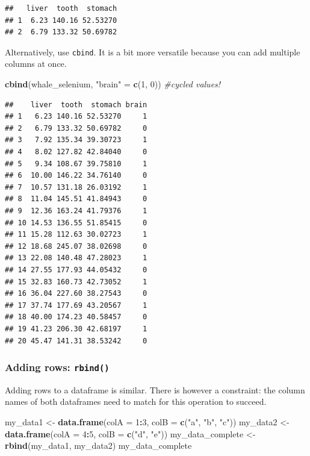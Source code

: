 \documentclass[]{book}
\newenvironment{Shaded}{\begin{snugshade}}{\end{snugshade}}
\newcommand{\CommentTok}[1]{\textcolor[rgb]{0.56,0.35,0.01}{\textit{#1}}}
\newcommand{\DataTypeTok}[1]{\textcolor[rgb]{0.13,0.29,0.53}{#1}}
\newcommand{\DecValTok}[1]{\textcolor[rgb]{0.00,0.00,0.81}{#1}}
\newcommand{\KeywordTok}[1]{\textcolor[rgb]{0.13,0.29,0.53}{\textbf{#1}}}
\newcommand{\NormalTok}[1]{#1}
\newcommand{\OperatorTok}[1]{\textcolor[rgb]{0.81,0.36,0.00}{\textbf{#1}}}
\newcommand{\StringTok}[1]{\textcolor[rgb]{0.31,0.60,0.02}{#1}}
\begin{document}
\begin{verbatim}
##   liver  tooth  stomach
## 1  6.23 140.16 52.53270
## 2  6.79 133.32 50.69782
\end{verbatim}

Alternatively, use \texttt{cbind}. It is a bit more versatile because you can add multiple columns at once.

\begin{Shaded}
\begin{Highlighting}[]
\KeywordTok{cbind}\NormalTok{(whale_selenium, }\StringTok{"brain"}\NormalTok{ =}\StringTok{ }\KeywordTok{c}\NormalTok{(}\DecValTok{1}\NormalTok{, }\DecValTok{0}\NormalTok{)) }\CommentTok{#cycled values!}
\end{Highlighting}
\end{Shaded}

\begin{verbatim}
##    liver  tooth  stomach brain
## 1   6.23 140.16 52.53270     1
## 2   6.79 133.32 50.69782     0
## 3   7.92 135.34 39.30723     1
## 4   8.02 127.82 42.84040     0
## 5   9.34 108.67 39.75810     1
## 6  10.00 146.22 34.76140     0
## 7  10.57 131.18 26.03192     1
## 8  11.04 145.51 41.84943     0
## 9  12.36 163.24 41.79376     1
## 10 14.53 136.55 51.85415     0
## 11 15.28 112.63 30.02723     1
## 12 18.68 245.07 38.02698     0
## 13 22.08 140.48 47.28023     1
## 14 27.55 177.93 44.05432     0
## 15 32.83 160.73 42.73052     1
## 16 36.04 227.60 38.27543     0
## 17 37.74 177.69 43.20567     1
## 18 40.00 174.23 40.58457     0
## 19 41.23 206.30 42.68197     1
## 20 45.47 141.31 38.53242     0
\end{verbatim}

\hypertarget{adding-rows-rbind}{%
\subsubsection*{\texorpdfstring{Adding rows: \texttt{rbind()}}{Adding rows: rbind()}}\label{adding-rows-rbind}}

Adding rows to a dataframe is similar. There is however a constraint: the column names of both dataframes need to match for this operation to succeed.

\begin{Shaded}
\begin{Highlighting}[]
\NormalTok{my_data1 <-}\StringTok{ }\KeywordTok{data.frame}\NormalTok{(}\DataTypeTok{colA =} \DecValTok{1}\OperatorTok{:}\DecValTok{3}\NormalTok{, }\DataTypeTok{colB =} \KeywordTok{c}\NormalTok{(}\StringTok{"a"}\NormalTok{, }\StringTok{"b"}\NormalTok{, }\StringTok{"c"}\NormalTok{))}
\NormalTok{my_data2 <-}\StringTok{ }\KeywordTok{data.frame}\NormalTok{(}\DataTypeTok{colA =} \DecValTok{4}\OperatorTok{:}\DecValTok{5}\NormalTok{, }\DataTypeTok{colB =} \KeywordTok{c}\NormalTok{(}\StringTok{"d"}\NormalTok{, }\StringTok{"e"}\NormalTok{))}
\NormalTok{my_data_complete <-}\StringTok{ }\KeywordTok{rbind}\NormalTok{(my_data1, my_data2)}
\NormalTok{my_data_complete}
\end{Highlighting}
\end{Shaded}
\end{document}
